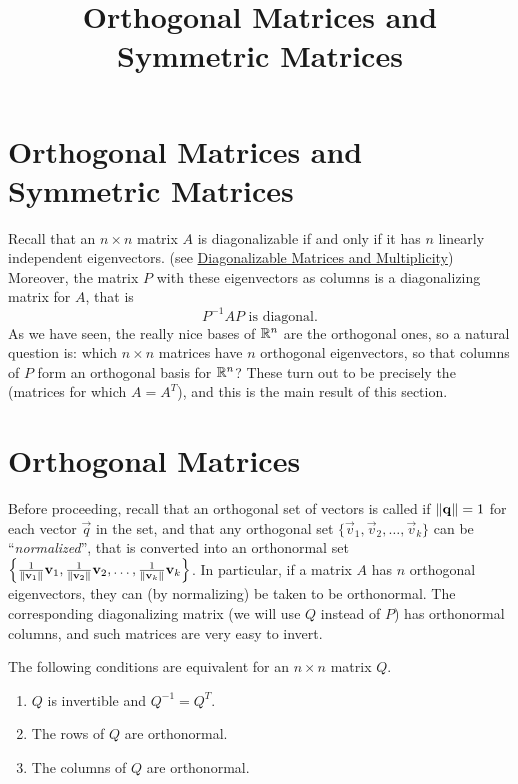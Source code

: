 \documentclass{ximera}
\title{Orthogonal Matrices and Symmetric Matrices} \license{CC BY-NC-SA 4.0}
\begin{document}
\begin{abstract}

\end{abstract}
\maketitle

\section*{Orthogonal Matrices and Symmetric Matrices}
Recall that an $n \times n$ matrix $A$ is diagonalizable if and only if it has $n$ linearly independent eigenvectors.  (see \href{https://ximera.osu.edu/oerlinalg/LinearAlgebra/EIG-0050/main}{Diagonalizable Matrices and Multiplicity}) Moreover, the matrix $P$ with these eigenvectors as columns is a diagonalizing matrix for $A$, that is
\begin{equation*}
P^{-1}AP \mbox{ is diagonal.}
\end{equation*}
As we have seen, the really nice bases of $\mathbb{R}^n$ are the orthogonal ones, so a natural question is: which $n \times n$ matrices have $n$ orthogonal eigenvectors, so that columns of $P$ form an orthogonal basis for $\mathbb{R}^n$? These turn out to be precisely the  (matrices for which $A=A^T$), and this is the main result of this section.

\section*{Orthogonal Matrices}
Before proceeding, recall that an orthogonal set of vectors is called  if $\left\lVert\mathbf{q}\right\rVert = 1$ for each vector $\vec{q}$ in the set, and that any orthogonal set $\{\vec{v}_{1}, \vec{v}_{2}, \dots, \vec{v}_{k}\}$ can be ``\textit{normalized}'', that is converted into an orthonormal set $\left\{ \frac{1}{\left\lVert\mathbf{v}_{1}\right\rVert}\mathbf{v}_{1}, \frac{1}{\left\lVert\mathbf{v}_{2}\right\rVert}\mathbf{v}_{2}, \dots, \frac{1}{\left\lVert\mathbf{v}_{k}\right\rVert}\mathbf{v}_{k} \right\}$. In particular, if a matrix $A$ has $n$ orthogonal eigenvectors, they can (by normalizing) be taken to be orthonormal. The corresponding diagonalizing matrix (we will use $Q$ instead of $P$) has orthonormal columns, and such matrices are very easy to invert.


\begin{theorem}\label{th:orthogonal_matrices}
The following conditions are equivalent for an $n \times n$ matrix $Q$.

\begin{enumerate}
\item\label{th:orthogonal_matrices_a} $Q$ is invertible and $Q^{-1} = Q^{T}$.

\item\label{th:orthogonal_matrices_b} The rows of $Q$ are orthonormal.

\item\label{th:orthogonal_matrices_c} The columns of $Q$ are orthonormal.

\end{enumerate}
\end{theorem}
\end{document}
